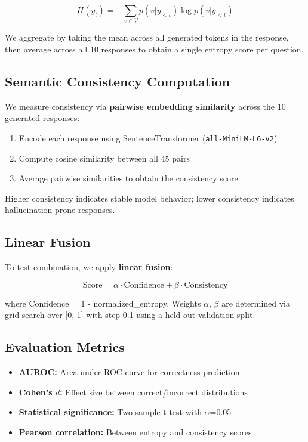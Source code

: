 \begin{equation}
H(y_t) = -\sum_{v \in V} p(v | y_{<t}) \log p(v | y_{<t})
\end{equation}

We aggregate by taking the mean across all generated tokens in the response, then average across all 10 responses to obtain a single entropy score per question.

\subsection{Semantic Consistency Computation}

We measure consistency via \textbf{pairwise embedding similarity} across the 10 generated responses:

\begin{enumerate}
    \item Encode each response using SentenceTransformer (\texttt{all-MiniLM-L6-v2})
    \item Compute cosine similarity between all 45 pairs
    \item Average pairwise similarities to obtain the consistency score
\end{enumerate}

Higher consistency indicates stable model behavior; lower consistency indicates hallucination-prone responses.

\subsection{Linear Fusion}

To test combination, we apply \textbf{linear fusion}:

\begin{equation}
\text{Score} = \alpha \cdot \text{Confidence} + \beta \cdot \text{Consistency}
\end{equation}

where Confidence = 1 - normalized\_entropy. Weights $\alpha$, $\beta$ are determined via grid search over [0, 1] with step 0.1 using a held-out validation split.

\subsection{Evaluation Metrics}

\begin{itemize}
    \item \textbf{AUROC:} Area under ROC curve for correctness prediction
    \item \textbf{Cohen's $d$:} Effect size between correct/incorrect distributions
    \item \textbf{Statistical significance:} Two-sample t-test with $\alpha$=0.05
    \item \textbf{Pearson correlation:} Between entropy and consistency scores
\end{itemize}
